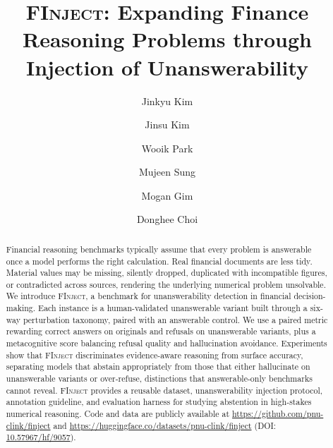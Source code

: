 \documentclass[sigconf,review]{acmart}
\newcommand{\bench}{\textsc{FInject}\xspace}
\begin{document}
\title{\bench: Expanding Finance Reasoning Problems through Injection of Unanswerability}

\author{Jinkyu Kim}

\author{Jinsu Kim}
\authornotemark[1]

\author{Wooik Park}
\authornotemark[1]

\author{Mujeen Sung}

\author{Mogan Gim}

\author{Donghee Choi}

\renewcommand{\shortauthors}{Kim et al.}


\begin{abstract}
Financial reasoning benchmarks typically assume that every problem is answerable once a model performs the right calculation.
Real financial documents are less tidy. 
Material values may be missing, silently dropped, duplicated with incompatible figures, or contradicted across sources, rendering the underlying numerical problem unsolvable.
We introduce \bench, a benchmark for unanswerability detection in financial decision-making.
Each instance is a human-validated unanswerable variant built through a six-way perturbation taxonomy, paired with an answerable control.
We use a paired metric rewarding correct answers on originals and refusals on unanswerable variants, plus a metacognitive score balancing refusal quality and hallucination avoidance.
Experiments show that \bench discriminates evidence-aware reasoning from surface accuracy, separating models that abstain appropriately from those that either hallucinate on unanswerable variants or over-refuse, distinctions that answerable-only benchmarks cannot reveal.
\bench provides a reusable dataset, unanswerability injection protocol, annotation guideline, and evaluation harness for studying abstention in high-stakes numerical reasoning.
Code and data are publicly available at \url{https://github.com/pnu-clink/finject} and \url{https://huggingface.co/datasets/pnu-clink/finject} (DOI: \href{https://doi.org/10.57967/hf/9057}{10.57967/hf/9057}).
\end{abstract}
\end{document}
